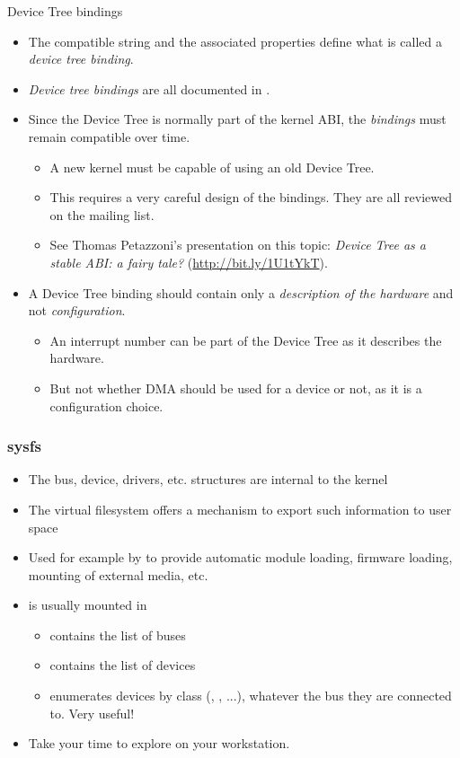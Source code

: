 \begin{frame}{Device Tree bindings}
  \begin{itemize}
  \item The compatible string and the associated properties define
    what is called a {\em device tree binding}.
  \item {\em Device tree bindings} are all documented in
    .
  \item Since the Device Tree is normally part of the kernel ABI, the
    {\em bindings} must remain compatible over time.
    \begin{itemize}
    \item A new kernel must be capable of using an old Device Tree.
    \item This requires a very careful design of the bindings. They
      are all reviewed on the 
      mailing list.
    \item See Thomas Petazzoni's presentation on this topic:
          {\em Device Tree as a stable ABI: a fairy tale?}
	  (\url{http://bit.ly/1U1tYkT}).
    \end{itemize}
  \item A Device Tree binding should contain only a {\em description
      of the hardware} and not {\em configuration}.
    \begin{itemize}
    \item An interrupt number can be part of the Device Tree as it
      describes the hardware.
    \item But not whether DMA should be used for a device or not,
      as it is a configuration choice.
    \end{itemize}
  \end{itemize}
\end{frame}

\begin{frame}
  \frametitle{sysfs}
  \begin{itemize}
  \item The bus, device, drivers, etc. structures are internal to the
    kernel
  \item The  virtual filesystem offers a mechanism to
    export such information to user space
  \item Used for example by  to provide automatic module loading,
    firmware loading, mounting of external media, etc.
  \item {} is usually mounted in 
    \begin{itemize}
    \item {} contains the list of buses
    \item {} contains the list of devices
    \item {} enumerates devices by class (,
      , ...), whatever the bus they are connected
      to. Very useful!
    \end{itemize}
  \item Take your time to explore  on your workstation.
  \end{itemize}
\end{frame}

